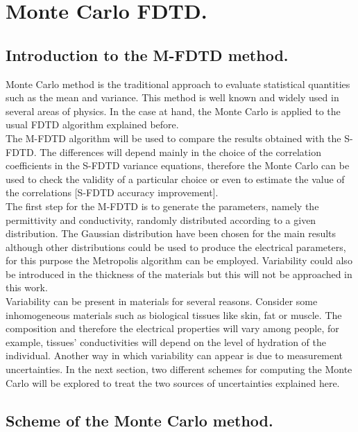 \documentclass[12pt, oneside]{book}
\begin{document}
\chapter{Monte Carlo FDTD.}
\section{Introduction to the M-FDTD method.}
\indent Monte Carlo method is the traditional approach to evaluate statistical quantities such as the mean and variance. This method is well known and widely used in several areas of physics. In the case at hand, the Monte Carlo is applied to the usual FDTD algorithm explained before. \\
\indent The M-FDTD algorithm will be used to compare the results obtained with the S-FDTD. The differences will depend mainly in the choice of the correlation coefficients in the S-FDTD variance equations, therefore the Monte Carlo can be used to check the validity of a particular choice or even to estimate the value of the correlations [S-FDTD accuracy improvement]. \\
\indent The first step for the M-FDTD is to generate the parameters, namely the permittivity and conductivity, randomly distributed according to a given distribution. The Gaussian distribution have been chosen for the main results although other distributions could be used to produce the electrical parameters, for this purpose the Metropolis algorithm can be employed. Variability could also be introduced in the thickness of the materials but this will not be approached in this work. \\
\indent Variability can be present in materials for several reasons. Consider some inhomogeneous materials such as biological tissues like skin, fat or muscle. The composition and therefore the electrical properties will vary among people, for example, tissues' conductivities will depend on the level of hydration of the individual.
Another way in which variability can appear is due to measurement uncertainties. In the next section, two different schemes for computing the Monte Carlo will be explored to treat the two sources of uncertainties explained here. 

\section{Scheme of the Monte Carlo method.}
\end{document}
